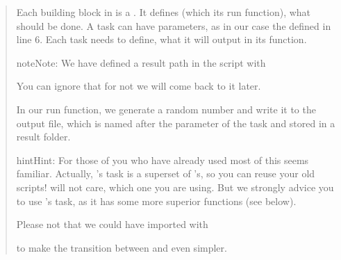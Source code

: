 \documentclass[letterpaper,10pt,english]{sphinxmanual}
\begin{document}
\begin{enumerate}
\begin{quote}
Each building block in  is a {\hyperref[\detokenize{documentation/api:b2luigi.Task}]{}}.
It defines (which its run function), what should be done.
A task can have parameters, as in our case the  defined in line 6.
Each task needs to define, what it will output in its  function.

\begin{sphinxadmonition}{note}{Note:}
We have defined a result path in the script with

\begin{sphinxVerbatim}[commandchars=\\\{\}]
\end{sphinxVerbatim}

You can ignore that for not \sphinxhyphen{} we will come back to it later.
\end{sphinxadmonition}

In our run function, we generate a random number and write it to the output file,
which is named after the parameter of the task and stored in a result folder.

\begin{sphinxadmonition}{hint}{Hint:}
For those of you who have already used  most of this seems familiar.
Actually, ’s task is a superset of ’s, so you can reuse
your old scripts!
 will not care, which one you are using.
But we strongly advice you to use ’s task, as it has some more
superior functions (see below).
\end{sphinxadmonition}

Please not that we could have imported  with

\begin{sphinxVerbatim}[commandchars=\\\{\}]
   
\end{sphinxVerbatim}

to make the transition between  and  even simpler.
\end{quote}


\end{enumerate}
\end{document}
